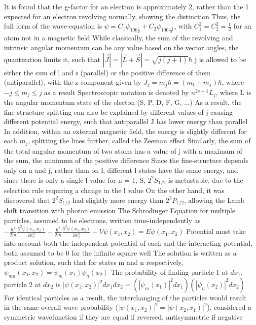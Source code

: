 \documentclass[11 pt, twoside]{article}
\newenvironment{outline*}
{
	\begin{outline}[enumerate]
	}
	{\end{outline}
}
\begin{document}
\begin{outline*}
	\2 It is found that the g-factor for an electron is approximately 2, rather than the 1 expected for an electron revolving normally, showing the distinction
	\2 Thus, the full form of the wave-equation is $\psi = C_1\psi_{100\frac{1}{2}} + C_2\psi_{100\frac{-1}{2}}$, with $C_1^2 = C_2^2 = \frac{1}{2}$ for an atom not in a magnetic field
\1 While classically, the sum of the revolving and intrinsic angular momentum can be any value based on the vector angles, the quantization limits it, such that $|\vec{J}| = |\vec{L} + \vec{S}| = \sqrt{j(j + 1)}\hbar$
	\2 j is allowed to be either the sum of l and s (parallel) or the positive difference of them (antiparallel), with the z component given by $J_z = m_j\hbar = (m_l + m_s)\hbar$, where $-j \leq m_j \leq j$ as a result
		\3 Spectroscopic notation is denoted by $n^{2s + 1}L_j$, where L is the angular momentum state of the electon (S, P, D, F, G, ...)
		\3 As a result, the fine structure splitting can also be explained by different values of j causing different potential energy, such that antiparallel J has lower energy than parallel
		\3 In addition, within an external magnetic field, the energy is slightly different for each $m_j$, splitting the lines further, called the Zeeman effect
	\2 Similarly, the sum of the total angular momentum of two atoms has a value of j with a maximum of the sum, the minimum of the positive difference
	\2 Since the fine-structure depends only on n and j, rather than on l, different l states have the same energy, and since there is only a single l value for n = 1, S, $2^2S_{1/2}$ is metastable, due to the selection rule requiring a change in the l value
		\3 On the other hand, it was discovered that $2^2S_{1/2}$ had slightly more energy than $2^2P_{1/2}$, allowing the Lamb shift transition with photon emission
\1 The Schrodinger Equation for multiple particles, assumed to be electrons, written time-independently as $-\frac{\hbar^2}{2m}\frac{\partial^2\psi(x_1, x_2)}{\partial x_1^2} -\frac{\hbar^2}{2m}\frac{\partial^2\psi(x_1, x_2)}{\partial x_2^2} + V\psi(x_1, x_2) = E\psi(x_1, x_2)$
	\2 Potential must take into account both the independent potential of each and the interacting potential, both assumed to be 0 for the infinite square well
	\2 The solution is written as a product solution, such that for states m and n respectively, $\psi_{mn}(x_1, x_2) = \psi_m(x_1)\psi_n(x_2)$
		\3 The probability of finding particle 1 at $dx_1$, particle 2 at $dx_2$ is $|\psi(x_1, x_2)|^2dx_1dx_2 = (|\psi_m(x_1)|^2dx_1)(|\psi_n(x_2)|^2dx_2)$
		\3 For identical particles as a result, the interchanging of the particles would result in the same overall wave probability ($|\psi(x_1, x_2)|^2 = |\psi(x_2, x_1)|^2$), considered a symmetric wavefunction if they are equal if reversed, antisymmetric if negative

\end{outline*}
\end{document}
